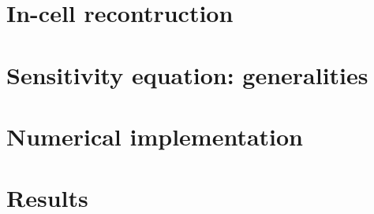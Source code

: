 \documentclass[10pt]{article}
\begin{document}
\section{In-cell recontruction}
 
\section{Sensitivity equation: generalities}

\section{Numerical implementation}

\section{Results}


 

 
\end{document}
